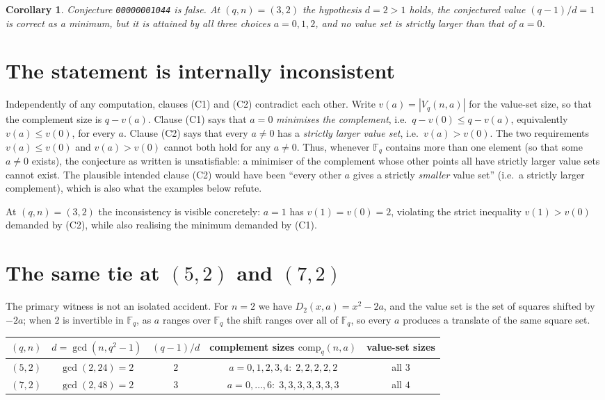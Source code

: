 \documentclass[11pt]{article}
\newtheorem{corollary}[theorem]{Corollary}
\theoremstyle{definition}
\theoremstyle{remark}
\newcommand{\F}{\mathbb{F}}
\begin{document}
\begin{corollary}
Conjecture \texttt{00000001044} is false. At $(q,n) = (3,2)$ the hypothesis
$d = 2 > 1$ holds, the conjectured value $(q-1)/d = 1$ is correct as a
\emph{minimum}, but it is attained by all three choices $a = 0,1,2$, and no
value set is strictly larger than that of $a=0$.
\end{corollary}

\section{The statement is internally inconsistent}
\label{sec:inconsistent}

Independently of any computation, clauses (C1) and (C2) contradict each other.
Write $v(a) = |V_q(n,a)|$ for the value-set size, so that the complement size
is $q - v(a)$. Clause (C1) says that $a=0$ \emph{minimises the complement},
i.e.\ $q - v(0) \le q - v(a)$, equivalently $v(a) \le v(0)$, for every $a$.
Clause (C2) says that every $a \ne 0$ has a \emph{strictly larger value set},
i.e.\ $v(a) > v(0)$. The two requirements $v(a) \le v(0)$ and $v(a) > v(0)$
cannot both hold for any $a \ne 0$. Thus, whenever $\F_q$ contains more than
one element (so that some $a \ne 0$ exists), the conjecture as written is
unsatisfiable: a minimiser of the complement whose other points all have
strictly larger value sets cannot exist. The plausible intended clause (C2)
would have been ``every other $a$ gives a strictly \emph{smaller} value set''
(i.e.\ a strictly larger complement), which is also what the examples below
refute.

At $(q,n) = (3,2)$ the inconsistency is visible concretely: $a=1$ has
$v(1) = v(0) = 2$, violating the strict inequality $v(1) > v(0)$ demanded by
(C2), while also realising the minimum demanded by (C1).

\section{The same tie at $(5,2)$ and $(7,2)$}

The primary witness is not an isolated accident. For $n = 2$ we have
$D_2(x,a) = x^2 - 2a$, and the value set is the set of squares shifted
by $-2a$; when $2$ is invertible in $\F_q$, as $a$ ranges over $\F_q$ the shift
ranges over all of $\F_q$, so every $a$ produces a translate of the same square
set.

\begin{center}
\begin{tabular}{c c c c c}
\toprule
$(q,n)$ & $d = \gcd(n,q^2-1)$ & $(q-1)/d$ & complement sizes $\mathrm{comp}_q(n,a)$ & value-set sizes \\
\midrule
$(5,2)$ & $\gcd(2,24) = 2$ & $2$ & $a=0,1,2,3,4:\; 2,2,2,2,2$ & all $3$ \\
$(7,2)$ & $\gcd(2,48) = 2$ & $3$ & $a=0,\dots,6:\; 3,3,3,3,3,3,3$ & all $4$ \\
\bottomrule
\end{tabular}
\end{center}
\end{document}
